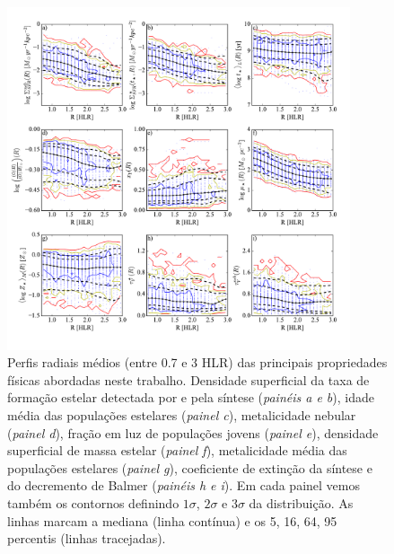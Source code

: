 \begin{figure}
	\centering
	\includegraphics[width=0.9\textwidth]{figuras/props_R.pdf}
	\caption[Perfis radiais das propriedades físicas.]
	{Perfis radiais médios (entre 0.7 e 3 HLR) das principais propriedades físicas abordadas neste
trabalho. Densidade superficial da taxa de formação estelar detectada por \Halpha e pela síntese
({\em painéis a e b}), idade média das populações estelares ({\em painel c}), metalicidade nebular
({\em painel d}), fração em luz de populações jovens ({\em painel e}), densidade superficial de
massa estelar ({\em painel f}), metalicidade média das populações estelares ({\em painel g}),
coeficiente de extinção da síntese e do decremento de Balmer ({\em painéis h e i}). Em cada painel
vemos também os contornos definindo $1\sigma$, $2\sigma$ e $3\sigma$ da distribuição. As linhas
marcam a mediana (linha contínua) e os 5, 16, 64, 95 percentis (linhas tracejadas).}
	\label{fig:RadProfProps}
\end{figure}


